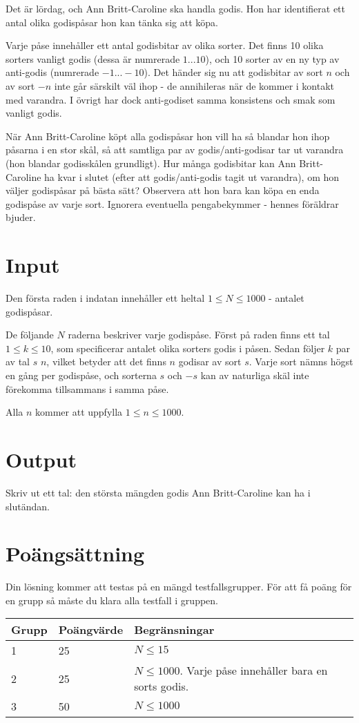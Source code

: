Det är lördag, och Ann Britt-Caroline ska handla godis. Hon har identifierat ett antal olika godispåsar hon kan tänka sig att köpa.

Varje påse innehåller ett antal godisbitar av olika sorter. Det finns 10 olika sorters vanligt godis (dessa är numrerade $1...10$), och 10 sorter av en ny typ av anti-godis (numrerade $-1...-10$). Det händer sig nu att godisbitar av sort $n$ och av sort $-n$ inte går särskilt väl ihop - de annihileras när de kommer i kontakt med varandra. I övrigt har dock anti-godiset samma konsistens och smak som vanligt godis.

När Ann Britt-Caroline köpt alla godispåsar hon vill ha så blandar hon ihop påsarna i en stor skål, så att samtliga par av godis/anti-godisar tar ut varandra (hon blandar godisskålen grundligt). Hur många godisbitar kan Ann Britt-Caroline ha kvar i slutet (efter att godis/anti-godis tagit ut varandra), om hon väljer godispåsar på bästa sätt? Observera att hon bara kan köpa en enda godispåse av varje sort. Ignorera eventuella pengabekymmer - hennes föräldrar bjuder.

\section*{Input}
Den första raden i indatan innehåller ett heltal $1 \le N \le 1000$ - antalet godispåsar.

De följande $N$ raderna beskriver varje godispåse.
Först på raden finns ett tal $1 \le k \le 10$, som specificerar antalet olika sorters godis i påsen.
Sedan följer $k$ par av tal $s$ $n$, vilket betyder att det finns $n$ godisar av sort $s$.
Varje sort nämns högst en gång per godispåse, och sorterna $s$ och $-s$ kan av naturliga skäl inte förekomma tillsammans i samma påse.

Alla $n$ kommer att uppfylla $1 \le n \le 1000$.

\section*{Output}
Skriv ut ett tal: den största mängden godis Ann Britt-Caroline kan ha i slutändan.

\section*{Poängsättning}
Din lösning kommer att testas på en mängd testfallsgrupper. För att få poäng för en grupp så måste du klara alla testfall i gruppen.

\begin{tabular}{| l | l | l |}
	\hline
	Grupp & Poängvärde & Begränsningar\\ \hline
  1     & 25         & $N \le 15$ \\ \hline
  2     & 25         & $N \le 1000$. Varje påse innehåller bara en sorts godis. \\ \hline
  3     & 50         & $N \le 1000$ \\ \hline
\end{tabular}
